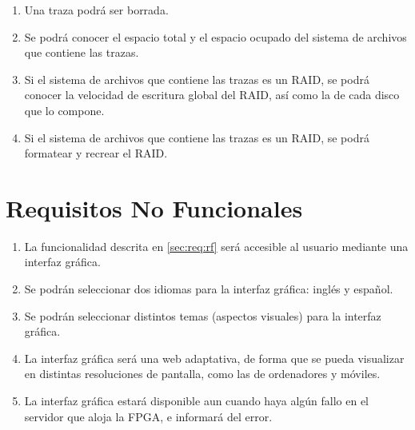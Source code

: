 \begin{enumerate}[before=\itshape,font=\normalfont,label=\bfseries RF. \arabic*]
  \item Una \gls{traza} podrá ser borrada.
  \item Se podrá conocer el espacio total y el espacio ocupado del sistema de archivos que contiene las \glspl{traza}.
  \item Si el sistema de archivos que contiene las \glspl{traza} es un \gls{RAID}, se podrá conocer la velocidad de escritura global del \gls{RAID}, así como la de cada disco que lo compone.
  \item Si el sistema de archivos que contiene las \glspl{traza} es un \gls{RAID}, se podrá formatear y recrear el \gls{RAID}.
\end{enumerate}


\section{Requisitos No Funcionales\label{sec:req:rnf}}

\begin{enumerate}[before=\itshape,font=\normalfont,label=\bfseries RNF. \arabic*]
  \item La funcionalidad descrita en \ref{sec:req:rf} será accesible al usuario mediante una interfaz gráfica.
  \item Se podrán seleccionar dos idiomas para la interfaz gráfica: inglés y español.
  \item Se podrán seleccionar distintos temas (aspectos visuales) para la interfaz gráfica.
  \item La interfaz gráfica será una web adaptativa, de forma que se pueda visualizar en distintas resoluciones de pantalla, como las de ordenadores y móviles.
  \item La interfaz gráfica estará disponible aun cuando haya algún fallo en el servidor que aloja la \gls{FPGA}, e informará del error.
\end{enumerate}